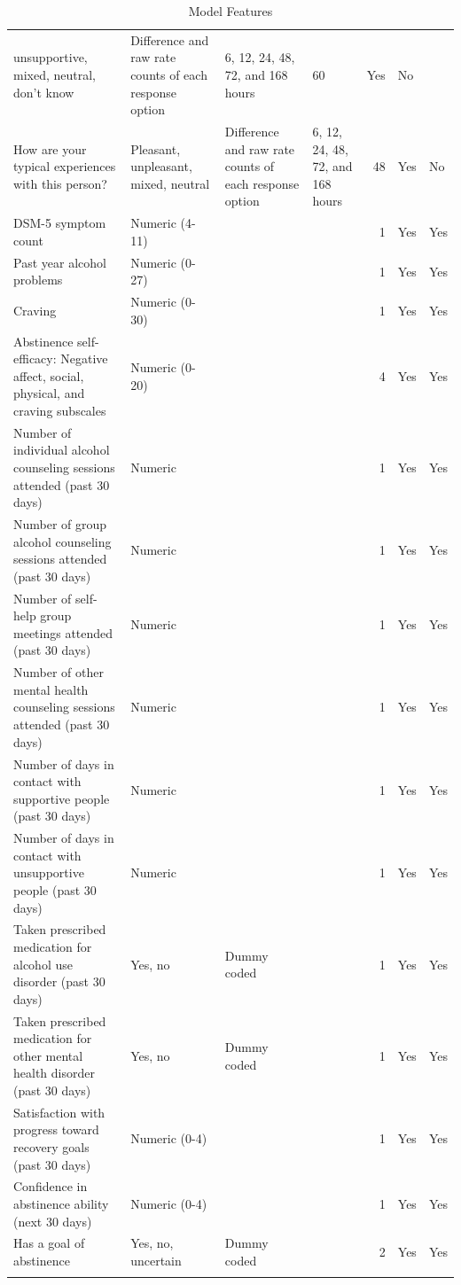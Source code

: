 \documentclass[
  letterpaper,
  DIV=11,
  numbers=noendperiod]{scrartcl}
\begin{document}
\begin{longtable}[]{@{}llllrll@{}}
unsupportive, mixed, neutral, don't know & Difference and raw rate
counts of each response option & 6, 12, 24, 48, 72, and 168 hours & 60 &
Yes & No \\
How are your typical experiences with this person? & Pleasant,
unpleasant, mixed, neutral & Difference and raw rate counts of each
response option & 6, 12, 24, 48, 72, and 168 hours & 48 & Yes & No \\
DSM-5 symptom count & Numeric (4-11) & & & 1 & Yes & Yes \\
Past year alcohol problems & Numeric (0-27) & & & 1 & Yes & Yes \\
Craving & Numeric (0-30) & & & 1 & Yes & Yes \\
Abstinence self-efficacy: Negative affect, social, physical, and craving
subscales & Numeric (0-20) & & & 4 & Yes & Yes \\
Number of individual alcohol counseling sessions attended (past 30 days)
& Numeric & & & 1 & Yes & Yes \\
Number of group alcohol counseling sessions attended (past 30 days) &
Numeric & & & 1 & Yes & Yes \\
Number of self-help group meetings attended (past 30 days) & Numeric & &
& 1 & Yes & Yes \\
Number of other mental health counseling sessions attended (past 30
days) & Numeric & & & 1 & Yes & Yes \\
Number of days in contact with supportive people (past 30 days) &
Numeric & & & 1 & Yes & Yes \\
Number of days in contact with unsupportive people (past 30 days) &
Numeric & & & 1 & Yes & Yes \\
Taken prescribed medication for alcohol use disorder (past 30 days) &
Yes, no & Dummy coded & & 1 & Yes & Yes \\
Taken prescribed medication for other mental health disorder (past 30
days) & Yes, no & Dummy coded & & 1 & Yes & Yes \\
Satisfaction with progress toward recovery goals (past 30 days) &
Numeric (0-4) & & & 1 & Yes & Yes \\
Confidence in abstinence ability (next 30 days) & Numeric (0-4) & & & 1
& Yes & Yes \\
Has a goal of abstinence & Yes, no, uncertain & Dummy coded & & 2 & Yes
& Yes \\


\caption{\label{tbl-1}Model Features}

\tabularnewline
\end{longtable}
\end{document}
